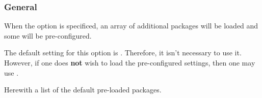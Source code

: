 \documentclass[babel=english,highlight=false]{skdoc}
\begin{document}
            \subsubsection{General}
                When the option   is specificed, an array of additional packages will be loaded and some will be pre-configured.

                \begin{hint}{}
                    The default setting for this option is  . Therefore, it isn't necessary to use it. However, if one does \textbf{not} wish to load the pre-configured settings, then one may use .
                \end{hint}

                \noindent Herewith a list of the default pre-loaded packages.
                
\end{document}
